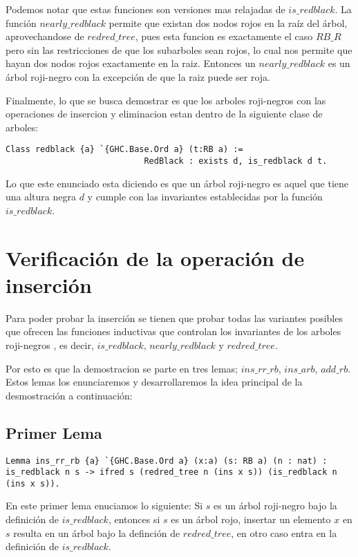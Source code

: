 \documentclass[letterpaper,12pt,oneside]{book}
\newcommand{\arn}{árbol roji-negro }
\newcommand{\arns}{arboles roji-negros }
\begin{document}
Podemos notar que estas funciones son versiones mas relajadas de $is\_redblack$. La funci\'on $nearly\_redblack$ permite que existan dos nodos rojos
en la ra\'iz del \'arbol, aprovechandose de $redred\_tree$, pues esta funcion es exactamente el caso $RB\_R$ pero sin las restricciones de que los subarboles sean rojos, lo 
cual nos permite que hayan dos nodos rojos exactamente en la raiz. Entonces un $nearly\_redblack$ es un \arn con la excepci\'on de que la raiz puede ser roja. 

Finalmente, lo que se busca demostrar es que los \arns con las operaciones de insercion y eliminacion estan dentro de la siguiente clase de arboles:

\begin{verbatim}
Class redblack {a} `{GHC.Base.Ord a} (t:RB a) := 
                            RedBlack : exists d, is_redblack d t.
\end{verbatim}

Lo que este enunciado esta diciendo es que un \arn es aquel que tiene una altura negra $d$ y cumple con las invariantes establecidas por la funci\'on 
$is\_redblack$.
\section{Verificación de la operación de inserción}

Para poder probar la inserci\'on se tienen que probar todas las variantes posibles que ofrecen las funciones inductivas
que controlan los invariantes de los \arns, es decir, $is\_redblack$, $nearly\_redblack$ y $redred\_tree$.

Por esto es que la demostracion se parte en tres lemas; $ins\_rr\_rb$, $ins\_arb$, $add\_rb$. Estos lemas los enunciaremos y desarrollaremos la idea principal
de la desmostraci\'on a continuaci\'on:

\subsection{Primer Lema}

\begin{verbatim}
Lemma ins_rr_rb {a} `{GHC.Base.Ord a} (x:a) (s: RB a) (n : nat) :
is_redblack n s -> ifred s (redred_tree n (ins x s)) (is_redblack n (ins x s)).
\end{verbatim}
 En este primer lema enuciamos lo siguiente: Si $s$ es un \arn bajo la definici\'on de $is\_redblack$, entonces 
 si $s$ es un \'arbol rojo, insertar un elemento $x$ en $s$ resulta en un \'arbol bajo la definci\'on de 
 $redred\_tree$, en otro caso entra en la definici\'on de $is\_redblack$.
\end{document}

